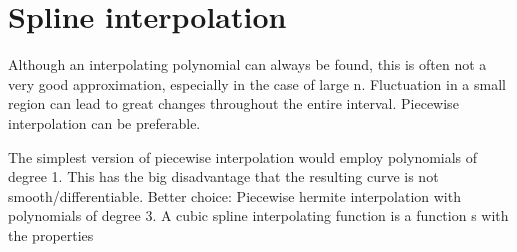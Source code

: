 \section{Spline interpolation}\label{sec:spline-interpolation}
Although an interpolating polynomial can always be found, this is often not a very good approximation, especially in the case of large n.
Fluctuation in a small region can lead to great changes throughout the entire interval.
Piecewise interpolation can be preferable.

The simplest version of piecewise interpolation would employ polynomials of degree 1.
This has the big disadvantage that the resulting curve is not smooth/differentiable.
Better choice: Piecewise hermite interpolation with polynomials of degree 3.
A cubic spline interpolating function is a function s with the properties

